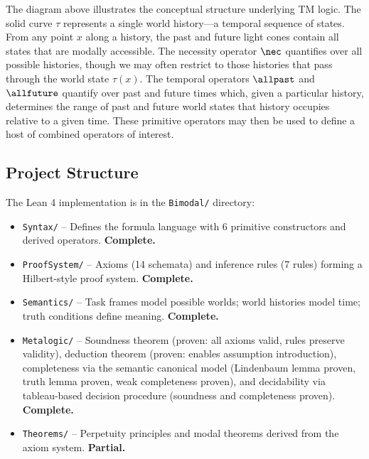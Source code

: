 \documentclass[../BimodalReference.tex]{subfiles}
\begin{document}
\noindent
The diagram above illustrates the conceptual structure underlying TM logic.
The solid curve $\tau$ represents a single world history---a temporal sequence of states.
From any point $x$ along a history, the past and future light cones contain all states that are modally accessible.
The necessity operator $\nec$ quantifies over all possible histories, though we may often restrict to those histories that pass through the world state $\tau(x)$.
The temporal operators $\allpast$ and $\allfuture$ quantify over past and future times which, given a particular history, determines the range of past and future world states that history occupies relative to a given time.
These primitive operators may then be used to define a host of combined operators of interest.

\subsection*{Project Structure}

The Lean 4 implementation is in the \texttt{Bimodal/} directory:
\begin{itemize}
  \item \texttt{Syntax/} -- Defines the formula language with 6 primitive constructors and derived operators.
  \textbf{Complete.}
  \item \texttt{ProofSystem/} -- Axioms (14 schemata) and inference rules (7 rules) forming a Hilbert-style proof system.
  \textbf{Complete.}
  \item \texttt{Semantics/} -- Task frames model possible worlds; world histories model time; truth conditions define meaning.
  \textbf{Complete.}
  \item \texttt{Metalogic/} -- Soundness theorem (proven: all axioms valid, rules preserve validity), deduction theorem (proven: enables assumption introduction), completeness via the semantic canonical model (Lindenbaum lemma proven, truth lemma proven, weak completeness proven), and decidability via tableau-based decision procedure (soundness and completeness proven).
  \textbf{Complete.}
  \item \texttt{Theorems/} -- Perpetuity principles and modal theorems derived from the axiom system.
  \textbf{Partial.}
\end{itemize}
\end{document}
